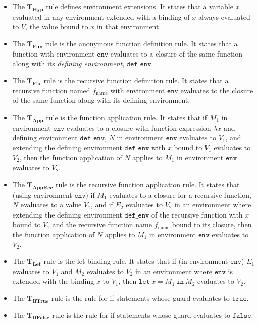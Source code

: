 \documentclass[pageno]{jpaper}
\newcommand{\env}{\mathtt{env}}
\newcommand{\mt}[1]{\mathtt{#1}}
\newcommand{\rulename}[2]{$\boldsymbol{#1}_{\textbf{#2}}$}
\begin{document}
\begin{itemize}
  \item The \rulename{T}{Hyp} rule defines environment extensions. It states that a variable $x$ evaluated in any environment extended with a binding of $x$ always evaluated to $V$, the value bound to $x$ in that environment.
  \item The \rulename{T}{Fun} rule is the anonymous function definition rule. It states that a function with environment $\env$ evaluates to a closure of the same function along with its \emph{defining environment}, $\mt{def\_env}$.
  \item The \rulename{T}{Fix} rule is the recursive function definition rule. It states that a recursive function named $f_{\textrm{name}}$ with environment $\env$ evaluates to the closure of the same function along with its defining environment.
  \item The \rulename{T}{App} rule is the function application rule. It states that if $M_1$ in environment $\env$ evaluates to a closure with function expression $\lambda x$ and defining environment $\mt{def\_env}$, $N$ in environment $\env$ evaluates to $V_1$, and extending the defining environment $\mt{def\_env}$ with $x$ bound to $V_1$ evaluates to $V_2$, then the function application of $N$ applies to $M_1$ in environment $\env$ evaluates to $V_2$.
  \item The \rulename{T}{AppRec} rule is the recursive function application rule. It states that (using environment $\env$) if $M_1$ evaluates to a closure for a recursive function, $N$ evaluates to a value $V_1$, and if $E_2$ evaluates to $V_2$ in an environment where extending the defining environment $\mt{def\_env}$ of the recursive function with $x$ bound to $V_1$ and the recursive function name $f_{\textrm{name}}$ bound to its closure, then the function application of $N$ applies to $M_1$ in environment $\env$ evaluates to $V_2$.
  \item The \rulename{T}{Let} rule is the let binding rule. It states that if (in environment $\env$) $E_1$ evaluates to $V_1$ and $M_2$ evaluates to $V_2$ in an environment where $\env$ is extended with the binding $x$ to $V_1$, then $\mt{let} \ x=M_1 \ \mt{in} \ M_2$ evaluates to $V_2$.
  \item The \rulename{T}{IfTrue} rule is the rule for if statements whose guard evaluates to $\mt{true}$.
  \item The \rulename{T}{IfFalse} rule is the rule for if statements whose guard evaluates to $\mt{false}$.
\end{itemize}
\end{document}
